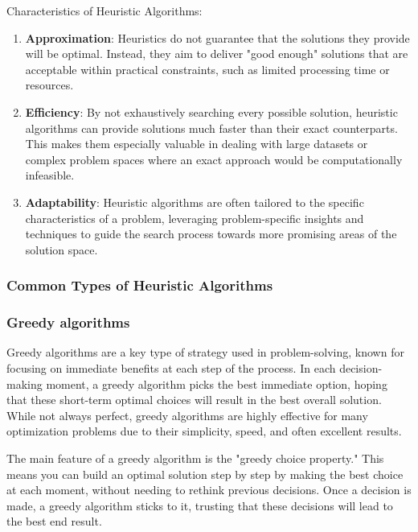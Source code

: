 \documentclass[
]{article}
\begin{document}
  Characteristics of Heuristic Algorithms:
  \begin{enumerate}
    \item \textbf{Approximation}: Heuristics do not guarantee that the solutions they provide will be optimal. Instead, they aim to deliver "good enough" solutions that are acceptable within practical constraints, such as limited processing time or resources.
    \item \textbf{Efficiency}: By not exhaustively searching every possible solution, heuristic algorithms can provide solutions much faster than their exact counterparts. This makes them especially valuable in dealing with large datasets or complex problem spaces where an exact approach would be computationally infeasible.
    \item \textbf{Adaptability}: Heuristic algorithms are often tailored to the specific characteristics of a problem, leveraging problem-specific insights and techniques to guide the search process towards more promising areas of the solution space.
  \end{enumerate}
  

  \hypertarget{nadpis-uxfarovnux11b-2-1}{%
  \subsubsection{Common Types of Heuristic Algorithms}\label{nadpis-uxfarovnux11b-2-1}}

  \hypertarget{nadpis-uxfarovnux11b-3-1}{%
  \subsubsection{Greedy algorithms}\label{nadpis-uxfarovnux11b-3-1}}

  Greedy algorithms are a key type of strategy used in problem-solving, known for focusing on immediate benefits at each step of the process. In each decision-making moment, a greedy algorithm picks the best immediate option, hoping that these short-term optimal choices will result in the best overall solution. While not always perfect, greedy algorithms are highly effective for many optimization problems due to their simplicity, speed, and often excellent results.

The main feature of a greedy algorithm is the "greedy choice property." This means you can build an optimal solution step by step by making the best choice at each moment, without needing to rethink previous decisions. Once a decision is made, a greedy algorithm sticks to it, trusting that these decisions will lead to the best end result.
\end{document}
